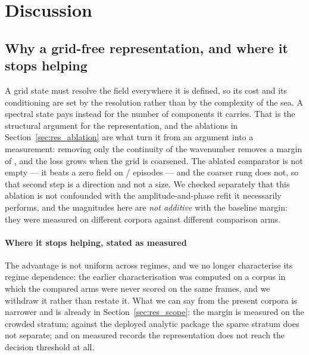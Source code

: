 \documentclass[review]{elsarticle}
\begin{document}
\section{Discussion}
\label{sec:discussion}

\subsection{Why a grid-free representation, and where it stops helping}
\label{sec:disc_gridfree}


A grid state must resolve the field everywhere it is defined, so its cost and its
conditioning are set by the resolution rather than by the complexity of the sea.
A spectral state pays instead for the number of components it carries. That is the
structural argument for the representation, and the ablations in
Section~\ref{sec:res_ablation} are what turn it from an argument into a measurement:
removing only the continuity of the wavenumber removes a margin of \BSixteenRel{},
and the loss grows when the grid is coarsened. The ablated comparator is not empty ---
it beats a zero field on \BSixteenCmpZero{}/\BSixteenN{} episodes --- and the coarser
rung does not, so that second step is a direction and not a size.
We checked separately that this ablation is not confounded with the
amplitude-and-phase refit it necessarily performs, and the magnitudes here are
\emph{not additive} with the baseline margin: they were measured on different
corpora against different comparison arms.

\paragraph{Where it stops helping, stated as measured}
The advantage is not uniform across regimes, and we no longer characterise its
regime dependence: the earlier characterisation was computed on a corpus in which
the compared arms were never scored on the same frames, and we withdraw it rather
than restate it. What we can say from the present corpora is narrower and is already
in Section~\ref{sec:res_scope}: the margin is measured on the crowded stratum;
against the deployed analytic package the sparse stratum does not separate; and on
measured records the representation does not reach the decision threshold at all.
\end{document}
